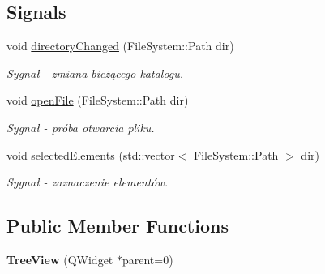 \subsection*{Signals}
\begin{DoxyCompactItemize}
\item 
\hypertarget{class_tree_view_aafd063aaf57e7ff1c825db4ba03e5d18}{
void \hyperlink{class_tree_view_aafd063aaf57e7ff1c825db4ba03e5d18}{directoryChanged} (FileSystem::Path dir)}
\label{class_tree_view_aafd063aaf57e7ff1c825db4ba03e5d18}

\begin{DoxyCompactList}\small\item\em Sygnał -\/ zmiana bieżącego katalogu. \item\end{DoxyCompactList}\item 
\hypertarget{class_tree_view_acc8c25815072a52f2cfbcf3e06181709}{
void \hyperlink{class_tree_view_acc8c25815072a52f2cfbcf3e06181709}{openFile} (FileSystem::Path dir)}
\label{class_tree_view_acc8c25815072a52f2cfbcf3e06181709}

\begin{DoxyCompactList}\small\item\em Sygnał -\/ próba otwarcia pliku. \item\end{DoxyCompactList}\item 
\hypertarget{class_tree_view_ae83b51108ab42dd3f94306f12c836fbe}{
void \hyperlink{class_tree_view_ae83b51108ab42dd3f94306f12c836fbe}{selectedElements} (std::vector$<$ FileSystem::Path $>$ dir)}
\label{class_tree_view_ae83b51108ab42dd3f94306f12c836fbe}

\begin{DoxyCompactList}\small\item\em Sygnał -\/ zaznaczenie elementów. \item\end{DoxyCompactList}\end{DoxyCompactItemize}
\subsection*{Public Member Functions}
\begin{DoxyCompactItemize}
\item 
\hypertarget{class_tree_view_aaa320b060caa0867f629c953b2d242a3}{
{\bfseries TreeView} (QWidget $\ast$parent=0)}
\label{class_tree_view_aaa320b060caa0867f629c953b2d242a3}

\end{DoxyCompactItemize}
